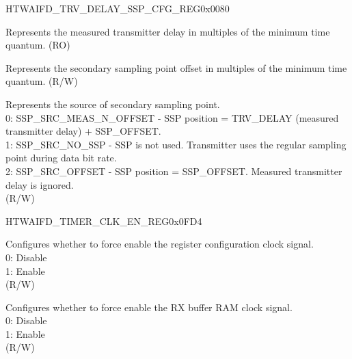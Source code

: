 \begin{register}{H}{TWAIFD\_TRV\_DELAY\_SSP\_CFG\_REG}{0x0080}\label{regdesc:TWAIFDTRVDELAYSSPCFGREG}
%
%
%
%
%
\regnewline%
\begin{regdesc}\begin{reglist}
\label{fielddesc:TWAIFDTRVDELAYVALUE}\item [TWAIFD\_TRV\_DELAY\_VALUE] Represents the measured transmitter delay in multiples of the minimum time quantum. (RO)
\label{fielddesc:TWAIFDSSPOFFSET}\item [TWAIFD\_SSP\_OFFSET] Represents the secondary sampling point offset in multiples of the minimum time quantum. (R/W)
\label{fielddesc:TWAIFDSSPSRC}\item [TWAIFD\_SSP\_SRC] Represents the source of secondary sampling point.\\
0: SSP\_SRC\_MEAS\_N\_OFFSET - SSP position = TRV\_DELAY (measured transmitter delay) + SSP\_OFFSET.\\
1: SSP\_SRC\_NO\_SSP - SSP is not used. Transmitter uses the regular sampling point during data bit rate.\\
2: SSP\_SRC\_OFFSET - SSP position = SSP\_OFFSET. Measured transmitter delay is ignored. \\(R/W)
\end{reglist}\end{regdesc}
\end{register}


\begin{register}{H}{TWAIFD\_TIMER\_CLK\_EN\_REG}{0x0FD4}\label{regdesc:TWAIFDTIMERCLKENREG}
%
%
%
\regnewline%
\begin{regdesc}\begin{reglist}
\label{fielddesc:TWAIFDCLKEN}\item [TWAIFD\_CLK\_EN] Configures whether to force enable the register configuration clock signal.\\
0: Disable\\
1: Enable\\(R/W)
\label{fielddesc:TWAIFDFORCERXBUFMEMCLKON}\item [TWAIFD\_FORCE\_RXBUF\_MEM\_CLK\_ON] Configures whether to force enable the RX buffer RAM clock signal.\\
0: Disable\\
1: Enable\\(R/W)
\end{reglist}\end{regdesc}
\end{register}


